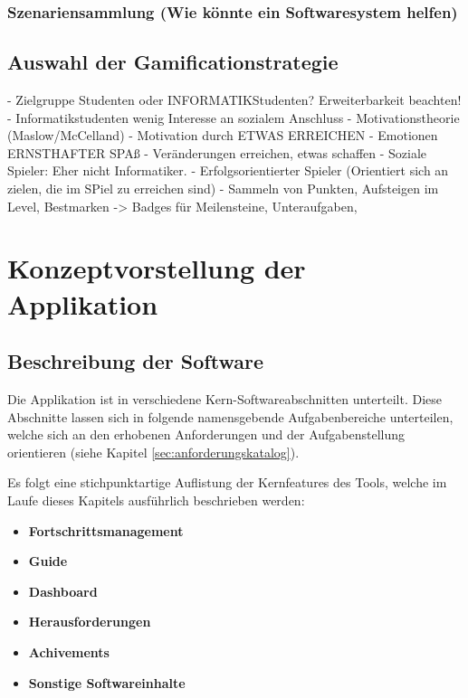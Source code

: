 \documentclass{scrreprt}
\begin{document}
\subsection{Szenariensammlung (Wie könnte ein Softwaresystem helfen)}

\newpage
\section{Auswahl der Gamificationstrategie}
- Zielgruppe Studenten oder INFORMATIKStudenten? Erweiterbarkeit beachten!
- Informatikstudenten wenig Interesse an sozialem Anschluss
- Motivationstheorie (Maslow/McCelland) 
- Motivation durch ETWAS ERREICHEN
- Emotionen ERNSTHAFTER SPAß - Veränderungen erreichen, etwas schaffen
- Soziale Spieler: Eher nicht Informatiker. 
- Erfolgsorientierter Spieler (Orientiert sich an zielen, die im SPiel zu erreichen sind)
- Sammeln von Punkten, Aufsteigen im Level, Bestmarken
-> Badges für Meilensteine, Unteraufgaben, 


\chapter{Konzeptvorstellung der Applikation} \label{chap:konzept}

\section{Beschreibung der Software}
\par Die Applikation ist in verschiedene Kern-Softwareabschnitten unterteilt. Diese Abschnitte lassen sich in folgende namensgebende Aufgabenbereiche unterteilen, welche sich an den erhobenen Anforderungen und der Aufgabenstellung orientieren (siehe Kapitel \ref{sec:anforderungskatalog}).\\

\par Es folgt eine stichpunktartige Auflistung der Kernfeatures des Tools, welche im Laufe dieses Kapitels ausführlich beschrieben werden:

\begin{itemize}
\item \textbf{Fortschrittsmanagement}
\item \textbf{Guide}
\item \textbf{Dashboard}
\item \textbf{Herausforderungen}
\item \textbf{Achivements}
\item \textbf{Sonstige Softwareinhalte}

\end{itemize}
\end{document}
